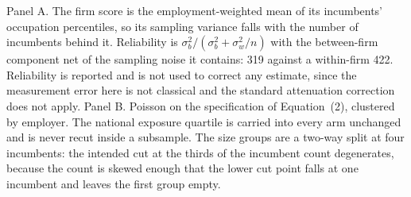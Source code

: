 \begin{table}[ht!]
\begin{tabular}{lrr}
\bottomrule
\end{tabular}
\begin{minipage}{0.92\textwidth}\footnotesize\vspace{4pt}
Panel A. The firm score is the employment-weighted mean of its incumbents' occupation percentiles, so its sampling variance falls with the number of incumbents behind it. Reliability is $\sigma^2_b/(\sigma^2_b+\sigma^2_w/n)$ with the between-firm component net of the sampling noise it contains: 319 against a within-firm 422. Reliability is reported and is not used to correct any estimate, since the measurement error here is not classical and the standard attenuation correction does not apply. Panel B. Poisson on the specification of Equation~(2), clustered by employer. The national exposure quartile is carried into every arm unchanged and is never recut inside a subsample. The size groups are a two-way split at four incumbents: the intended cut at the thirds of the incumbent count degenerates, because the count is skewed enough that the lower cut point falls at one incumbent and leaves the first group empty.
\end{minipage}
\end{table}
